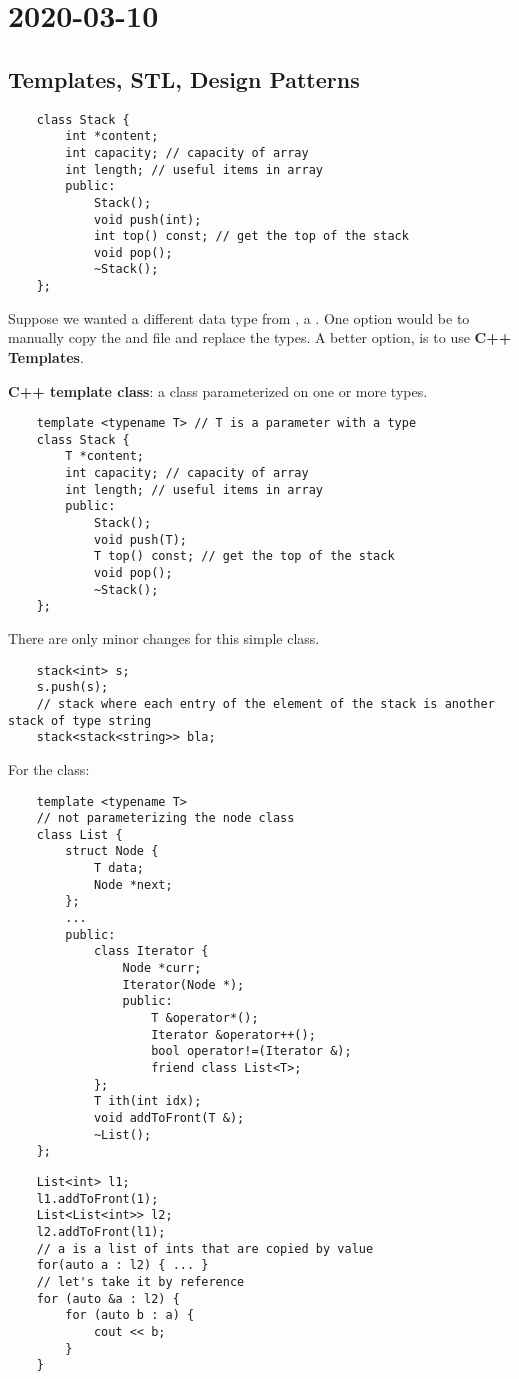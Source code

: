 \section{2020-03-10}
\subsection{Templates, STL, Design Patterns}
\begin{lstlisting}
    class Stack {
        int *content;
        int capacity; // capacity of array
        int length; // useful items in array
        public:
            Stack();
            void push(int);
            int top() const; // get the top of the stack
            void pop();
            ~Stack();
    };
\end{lstlisting}
Suppose we wanted a different data type from , a . One option
would be to manually copy the  and  file and replace the types.
A better option, is to use \textbf{C++ Templates}.

\textbf{C++ template class}: a class parameterized on one or more types.
\begin{lstlisting}
    template <typename T> // T is a parameter with a type
    class Stack {
        T *content;
        int capacity; // capacity of array
        int length; // useful items in array
        public:
            Stack();
            void push(T);
            T top() const; // get the top of the stack
            void pop();
            ~Stack();
    };
\end{lstlisting}
There are only minor changes for this simple class.
\begin{lstlisting}
    stack<int> s;
    s.push(s);
    // stack where each entry of the element of the stack is another stack of type string
    stack<stack<string>> bla;
\end{lstlisting}
For the  class:
\begin{lstlisting}
    template <typename T>
    // not parameterizing the node class
    class List {
        struct Node {
            T data;
            Node *next;
        };
        ...
        public:
            class Iterator {
                Node *curr;
                Iterator(Node *);
                public:
                    T &operator*();
                    Iterator &operator++();
                    bool operator!=(Iterator &);
                    friend class List<T>;
            };
            T ith(int idx);
            void addToFront(T &);
            ~List();
    };
\end{lstlisting}
\begin{lstlisting}
    List<int> l1;
    l1.addToFront(1);
    List<List<int>> l2;
    l2.addToFront(l1);
    // a is a list of ints that are copied by value
    for(auto a : l2) { ... }
    // let's take it by reference
    for (auto &a : l2) {
        for (auto b : a) {
            cout << b;
        }
    }
\end{lstlisting}

